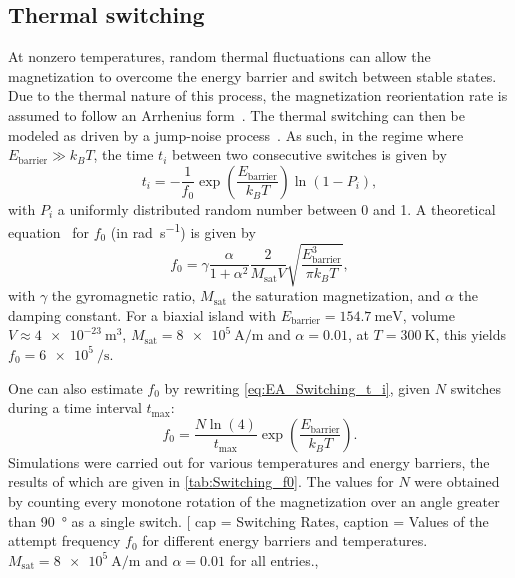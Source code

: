 \documentclass[twocolumn]{phdsymp}
\begin{document}
\subsection{Thermal switching}
At nonzero temperatures, random thermal fluctuations can allow the magnetization to overcome the energy barrier and switch between stable states. Due to the thermal nature of this process, the magnetization reorientation rate is assumed to follow an Arrhenius form~\cite{FAR-13}. The thermal switching can then be modeled as driven by a jump-noise process~\cite{MagDynamics_JumpNoise}. As such, in the regime where $E_{\mathrm{barrier}} \gg k_B T$, the time $t_i$ between two consecutive switches is given by
\begin{equation}
    t_i = -\frac{1}{f_0}\exp(\frac{E_{\mathrm{barrier}}}{k_B T}) \ln(1-P_i) \mathrm{,}
    \label{eq:EA_Switching_t_i}
\end{equation}
with $P_i$ a uniformly distributed random number between 0 and 1. A theoretical equation~\cite{MuMax3,LEL-17b,f0_mumax3_reference} for $f_0$ (in \si{\radian\per\second}) is given by
\begin{equation}
    f_0 = \gamma \frac{\alpha}{1+\alpha^2} \frac{2}{M_{\mathrm{sat}} V} \sqrt{\frac{E_{\mathrm{barrier}}^3}{\pi k_B T}} \mathrm{,}
    \label{eq:EA_Switching_theoretical}
\end{equation}
with $\gamma$ the gyromagnetic ratio, $M_{\mathrm{sat}}$ the saturation magnetization, and $\alpha$ the damping constant.
For a biaxial island with $E_{\mathrm{barrier}}=\SI{154.7}{\milli\electronvolt}$, volume $V\approx\SI{4e-23}{\metre\cubed}$, $M_{\mathrm{sat}}=\SI{8e5}{\ampere\per\metre}$ and $\alpha=0.01$, at $T=\SI{300}{\kelvin}$, this yields $f_0=\SI{6e5}{\per\second}$. \par
One can also estimate $f_0$ by rewriting \cref{eq:EA_Switching_t_i}, given $N$ switches during a time interval $t_{\mathrm{max}}$:
\begin{equation}
    f_0 = \frac{N \ln(4)}{t_{\mathrm{max}}} \exp(\frac{E_{\mathrm{barrier}}}{k_B T}) \mathrm{.}
\end{equation}
Simulations were carried out for various temperatures and energy barriers, the results of which are given in \cref{tab:Switching_f0}. The values for $N$ were obtained by counting every monotone rotation of the magnetization over an angle greater than \SI{90}{\degree} as a single switch.
\ctable[
    cap = Switching Rates,
    caption = {Values of the attempt frequency $f_0$ for different energy barriers and temperatures. $M_{\mathrm{sat}}=\SI{8e5}{\ampere\per\metre}$ and $\alpha=0.01$ for all entries.},
\end{document}
